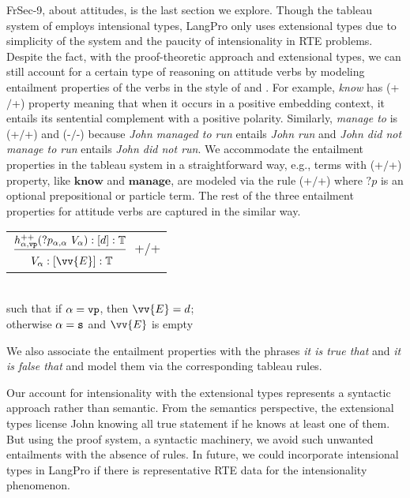 \documentclass[11pt]{article}
\makeatletter
\newcommand{\synt}[1]{\textbf{#1}}
\newcommand{\T}{\mathbb{T}}
\newcommand{\sen}{{\tt s}}
\newcommand{\vp}{{\tt vp}}
\newcommand{\nonBranchingRule}[3][]{
\begin{tabular}{@{}c@{}}
$\dfrac{
	\begin{tabular}{@{}r@{}}
			#2
	\end{tabular}}
{
	\raisebox{-4pt}{
		\begin{tabular}[t]{@{}r@{}}
   			#3
	\end{tabular}}
}$#1
\end{tabular}}
\makeatother
\begin{document}
FrSec-9, about attitudes, is the last section we explore.
Though the tableau system of \cite{muskens:10} employs intensional types, LangPro only uses extensional types due to simplicity of the system and the paucity of intensionality in RTE problems.
Despite the fact, with the proof-theoretic approach and extensional types, we can still account for a certain type of reasoning on attitude verbs by modeling entailment properties of the verbs in the style of  and .
For example, {\em know} has (+$/$+) property meaning that when it occurs in a positive embedding context, it entails its sentential complement with a positive polarity.
Similarly, {\em manage to} is (+$/$+) and (-$/$-) because {\em John managed to run} entails {\em John run} and {\em John did not manage to run} entails {\em John did not run}.
We accommodate the entailment properties in the tableau system in a straightforward way, e.g., terms with (+$/$+) property, like $\synt{know}$ and $\synt{manage}$, are modeled via the rule (+$/$+) where $?p$ is an optional prepositional or particle term.
The rest of the three entailment properties for attitude verbs are captured in the similar way.     

\begin{center}
\nonBranchingRule[~+$/$+]
{$h^{\text{++}}_{\alpha,\vp} (?p_{\alpha,\alpha} ~ V_\alpha) : [d] : \T$}
{$V_\alpha : [\vv{E}] : \T$}
\\such that if $\alpha = \vp$, then $\vv{E} = d$; 
\\otherwise $\alpha = \sen$ and $\vv{E}$ is empty 
\end{center}  

We also associate the entailment properties with the phrases {\em it is true that} and {\em it is false that} and model them via the corresponding tableau rules.

Our account for intensionality with the extensional types represents a syntactic approach rather than semantic.
From the semantics perspective, the extensional types license John knowing all true statement if he knows at least one of them.
But using the proof system, a syntactic machinery, we avoid such unwanted entailments with the absence of rules.
In future, we could incorporate intensional types in LangPro if there is representative RTE data for the intensionality phenomenon.  
\end{document}
